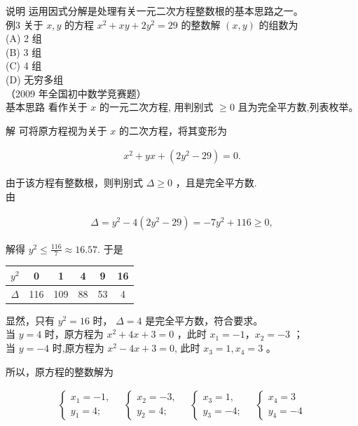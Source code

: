 \documentclass[10pt]{article}
\begin{document}
说明 运用因式分解是处理有关一元二次方程整数根的基本思路之一。\\
例3 关于 $x, y$ 的方程 $x^{2}+x y+2 y^{2}=29$ 的整数解 $(x, y)$ 的组数为\\
(A) 2 组\\
(B) 3 组\\
(C) 4 组\\
(D) 无穷多组\\
（2009 年全国初中数学竞赛题）\\
基本思路 看作关于 $x$ 的一元二次方程, 用判别式 $\geqslant 0$ 且为完全平方数,列表枚举。

解 可将原方程视为关于 $x$ 的二次方程，将其变形为

\begin{align*}
x^{2}+y x+\left(2 y^{2}-29\right)=0 .
\end{align*}

由于该方程有整数根，则判别式 $\Delta \geqslant 0$ ，且是完全平方数.\\
由

\begin{align*}
\Delta=y^{2}-4\left(2 y^{2}-29\right)=-7 y^{2}+116 \geqslant 0,
\end{align*}

解得 $y^{2} \leqslant \frac{116}{7} \approx 16.57$. 于是

\begin{center}
\begin{tabular}{|c|c|c|c|c|c|}
\hline
$y^{2}$ & 0 & 1 & 4 & 9 & 16 \\
\hline
$\Delta$ & 116 & 109 & 88 & 53 & 4 \\
\hline
\end{tabular}
\end{center}

显然，只有 $y^{2}=16$ 时， $\Delta=4$ 是完全平方数，符合要求。\\
当 $y=4$ 时，原方程为 $x^{2}+4 x+3=0$ ，此时 $x_{1}=-1 ， x_{2}=-3$ ；\\
当 $y=-4$ 时,原方程为 $x^{2}-4 x+3=0$, 此时 $x_{3}=1, x_{4}=3$ 。

所以，原方程的整数解为

\begin{align*}
\left\{\begin{array} { l } 
{ x _ { 1 } = - 1 , } \\
{ y _ { 1 } = 4 ; }
\end{array} \quad \left\{\begin{array} { l } 
{ x _ { 2 } = - 3 , } \\
{ y _ { 2 } = 4 ; }
\end{array} \quad \left\{\begin{array} { l } 
{ x _ { 3 } = 1 , } \\
{ y _ { 3 } = - 4 ; }
\end{array} \quad \left\{\begin{array}{l}
x_{4}=3 \\
y_{4}=-4
\end{array}\right.\right.\right.\right.
\end{align*}
\end{document}
